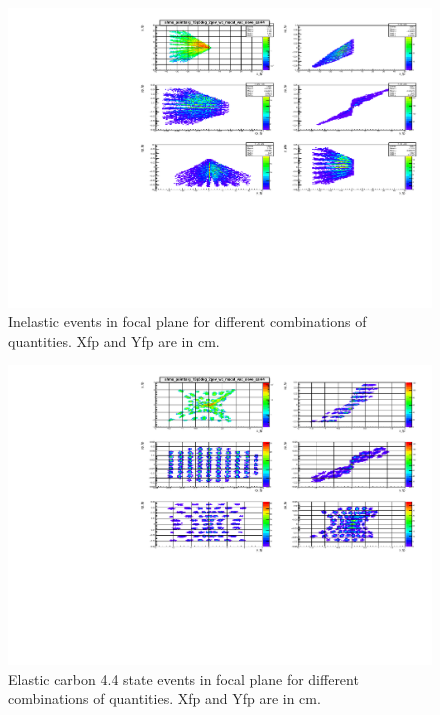 \documentclass[]{article}
\begin{document}
\begin{figure}	
\begin{center}
	\includegraphics[angle=90]{shms_pointtarg_13p5deg_2gev_wc_mscat_vac_sieve_car44_inelastic.pdf}
\end{center}
\caption{Inelastic events in focal plane for different combinations of quantities. Xfp and Yfp
	are in cm.}
\label{fig:inelastic}
\end{figure}

\begin{figure}	
	\begin{center}
		\includegraphics[angle=90]{shms_pointtarg_13p5deg_2gev_wc_mscat_vac_sieve_car44_44.pdf}
	\end{center}
	\caption{Elastic carbon 4.4 state events in focal plane for different combinations of quantities. Xfp and Yfp
	are in cm.}
	\label{fig:elastic44}
\end{figure}
\end{document}

